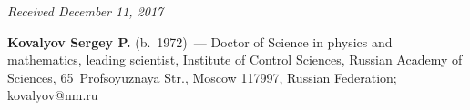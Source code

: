 \begin{multicols}{2}
{{ }
 }

\end{multicols}

\vspace*{-6pt}

\hfill{\small\textit{Received December 11, 2017}}

  

\Contrl

\noindent
\textbf{Kovalyov Sergey P.} (b.\ 1972)~--- Doctor of Science in physics and mathematics, leading 
scientist, Institute of Control Sciences, Russian Academy of Sciences, 65~Profsoyuznaya Str., 
Moscow 117997, Russian Federation; \mbox{kovalyov@nm.ru}

\label{end\stat}


\renewcommand{\bibname}{\protect\rm Литература} 
   